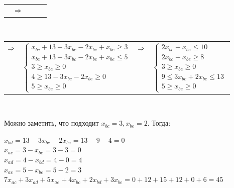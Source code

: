 \documentclass{article}
\begin{document}
\begin{center}
\begin{tabular}{ccccc}
			& $\hfill \Rightarrow \hfill$ 
		\end{tabular}\\
	\begin{tabular}{cccc}
		$\hfill \Rightarrow \hfill$ &
		$\begin{cases}
		x_{bc} + 13 - 3x_{bc} - 2x_{be} + x_{be} \geq 3 \\
		x_{bc} + 13 - 3x_{bc} - 2x_{be} + x_{be} \leq 5 \\
		3 \geq x_{bc} \geq 0 \\
		4 \geq 13 - 3x_{bc} - 2x_{be} \geq 0 \\
		5 \geq x_{be} \geq 0 
		\end{cases}$
		& $\hfill \Rightarrow \hfill$ &
		$\begin{cases}
		2x_{bc} + x_{be} \leq 10 \\
		2x_{bc} + x_{be} \geq 8 \\
		3 \geq x_{bc} \geq 0 \\
		9 \leq 3x_{bc} + 2x_{be} \leq 13 \\
		5 \geq x_{be} \geq 0 
		\end{cases}$
	\end{tabular}\\
	\end{center}
	Можно заметить, что подходит $x_{bc}=3, x_{be}=2$. Тогда:
	\begin{center}
		$x_{bd} = 13 - 3x_{bc} - 2x_{be} = 13 - 9 - 4 = 0$  \\
		$x_{ac} = 3 - x_{bc} = 3 - 3 = 0$ \\
		$x_{ad} = 4 - x_{bd} = 4 - 0 = 4$ \\
		$x_{ae} = 5 - x_{be} = 5 - 2 = 3$ \\
		$7x_{ac} + 3x_{ad} + 5x_{ae} + 4x_{bc} + 2x_{bd} + 3x_{be} = 0 + 12 + 15 + 12 + 0 + 6 = 45$
	\end{center}
\end{document}
